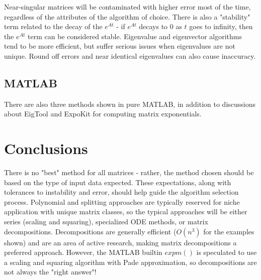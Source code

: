 \documentclass{article}
\begin{document}
Near-singular matrices will be contaminated with higher error 
most of the time, regardless of the attributes of the algorithm 
of choice. There is also a "stability" term related to the decay 
of the $e^{At}$ - if $e^{At}$ decays to 0 as $t$ goes to 
infinity, then the $e^{At}$ term can be considered stable.
\vspace*{1\baselineskip}
Eigenvalue and eigenvector algorithms tend to be more efficient, 
but suffer serious issues when eigenvalues are not unique.
Round off errors and near identical eigenvalues can also cause 
inaccuracy.

\subsection*{MATLAB}
There are also three methods shown in pure MATLAB, in addition to 
discussions about EigTool and ExpoKit for computing
matrix exponentials.

\section*{Conclusions}
There is no "best" method for all matrices - rather, the method 
chosen should be based on the type of input data expected. 
These expectations, along with tolerances to instability and 
error, should help guide the algorithm selection process. 
Polynomial and splitting approaches are typically reserved for 
niche application with unique matrix classes, so the typical 
approaches will be either series (scaling and squaring), 
specialized ODE methods, or matrix decompositions. 
\vspace*{1\baselineskip}
Decompositions are generally efficient ($O(n^3)$ for the examples 
shown) and are an area of active research, making matrix 
decompositions a preferred approach. However, the MATLAB builtin 
$expm()$ is speculated to use a scaling and squaring algorithm 
with Pade approximation, so decompositions are not always the 
"right answer"! 
\end{document}
